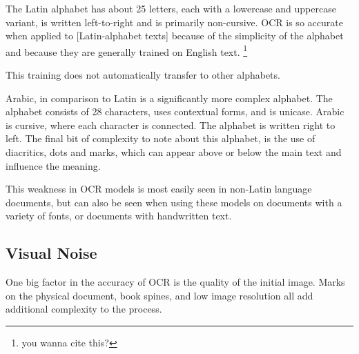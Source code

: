 \documentclass[sigplan,screen,nonacm]{acmart-tagged}
\begin{document}
The Latin alphabet has about 25 letters, each with a lowercase and uppercase variant, is written left-to-right and is primarily non-cursive. OCR is so accurate when applied to [Latin-alphabet texts] because of the simplicity of the alphabet and because they are generally trained on English text. \footnote{you wanna cite this?}

This training does not automatically transfer to other alphabets. %

Arabic, in comparison to Latin is a significantly more complex alphabet. The alphabet consists of 28 characters, uses contextual forms, and is unicase. Arabic is cursive, where each character is connected. The alphabet is written right to left. The final bit of complexity to note about this alphabet, is the use of diacritics, dots and marks, which can appear above or below the main text and influence the meaning.


This weakness in OCR models is most easily seen in non-Latin language documents, but can also be seen when using these models on documents with a variety of fonts, or documents with handwritten text. 

\subsection{Visual Noise}
\label{sec:Noise}

One big factor in the accuracy of OCR is the quality of the initial image. Marks on the physical document, book spines, and low image resolution all add additional complexity to the process. 
\end{document}
